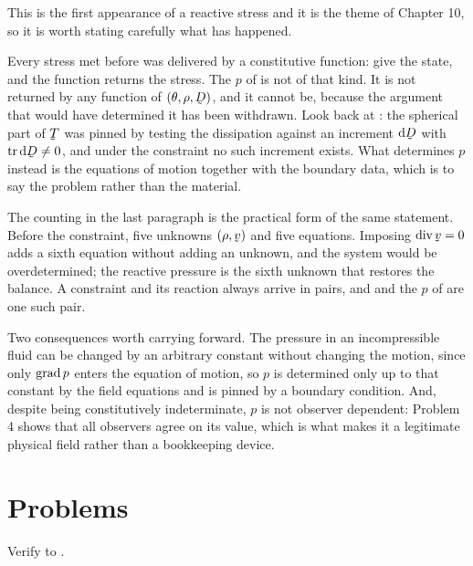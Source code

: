 \begin{remark}
\label{rem:ch9react}
This is the first appearance of a reactive stress and it is the theme
of Chapter 10, so it is worth stating carefully what has happened.

Every stress met before  was delivered by a constitutive
function: give the state, and the function returns the stress. The $p$
of  is not of that kind. It is not returned by any function
of $(\theta,\rho,\bD)$, and it cannot be, because the argument that
would have determined it has been withdrawn. Look back at :
the spherical part of $\bT$ was pinned by testing the dissipation
against an increment $\dl\bD$ with $\tr\dl\bD\neq0$, and under the
constraint no such increment exists. What determines $p$ instead is the
equations of motion together with the boundary data, which is to say the
problem rather than the material.

The counting in the last paragraph is the practical form of the same
statement. Before the constraint, five unknowns $(\rho,\bv)$ and five
equations. Imposing $\dvg\bv=0$ adds a sixth equation without adding an
unknown, and the system would be overdetermined; the reactive pressure
is the sixth unknown that restores the balance. A constraint and its
reaction always arrive in pairs, and  and the $p$ of
 are one such pair.

Two consequences worth carrying forward. The pressure in an
incompressible fluid can be changed by an arbitrary constant without
changing the motion, since only $\operatorname{grad} p$ enters the equation of motion,
so $p$ is determined only up to that constant by the field equations and
is pinned by a boundary condition. And, despite being constitutively
indeterminate, $p$ is not observer dependent: Problem 4 shows that all
observers agree on its value, which is what makes it a legitimate
physical field rather than a bookkeeping device.
\end{remark}
\setcounter{problemenv}{0}
\section{Problems}\label{sec:problems:c9}

\begin{problem}
Verify  to .
\end{problem}

